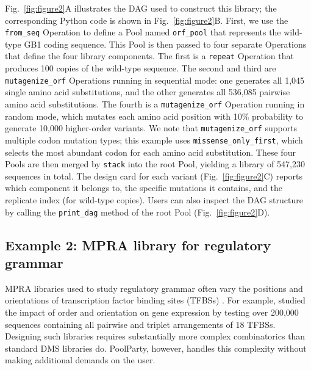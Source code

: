 \documentclass[pdflatex,sn-vancouver-num,referee,oneside]{sn-jnl}
\begin{document}
Fig.\ \ref{fig:figure2}A illustrates the DAG used to construct this library; the corresponding Python code is shown in Fig.\ \ref{fig:figure2}B. First, we use the \texttt{from\_seq} Operation to define a Pool named \texttt{orf\_pool} that represents the wild-type GB1 coding sequence. This Pool is then passed to four separate Operations that define the four library components. The first is a \texttt{repeat} Operation that produces 100 copies of the wild-type sequence. The second and third are \texttt{mutagenize\_orf} Operations running in sequential mode: one generates all 1,045 single amino acid substitutions, and the other generates all 536,085 pairwise amino acid substitutions. The fourth is a \texttt{mutagenize\_orf} Operation running in random mode, which mutates each amino acid position with 10\% probability to generate 10,000 higher-order variants. We note that \texttt{mutagenize\_orf} supports multiple codon mutation types; this example uses \texttt{missense\_only\_first}, which selects the most abundant codon for each amino acid substitution. These four Pools are then merged by \texttt{stack} into the root Pool, yielding a library of 547,230 sequences in total. The design card for each variant (Fig.~\ref{fig:figure2}C) reports which component it belongs to, the specific mutations it contains, and the replicate index (for wild-type copies). Users can also inspect the DAG structure by calling the \texttt{print\_dag} method of the root Pool (Fig.~\ref{fig:figure2}D).

\subsection{Example 2: MPRA library for regulatory grammar}\label{subsec:example2-mpra}

MPRA libraries used to study regulatory grammar often vary the positions and orientations of transcription factor binding sites (TFBSs) \citep{Melnikov2012dw, Sharon2012io, King2020aa, Smith2013kn, Grossman2017aa, WeingartenGabbay2019bl, GeorgakopoulosSoares2023tf}. For example, \citet{GeorgakopoulosSoares2023tf} studied the impact of order and orientation on gene expression by testing over 200,000 sequences containing all pairwise and triplet arrangements of 18 TFBSs. Designing such libraries requires substantially more complex combinatorics than standard DMS libraries do. PoolParty, however, handles this complexity without making additional demands on the user.
\end{document}
